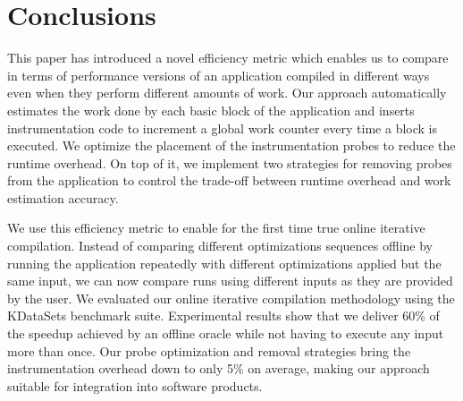 \section{Conclusions}
This paper has introduced a novel efficiency metric which enables us to compare in terms of performance versions of an application compiled
in different ways even when they perform different amounts of work. Our approach automatically estimates the work done by each basic block
of the application and inserts instrumentation code to increment a global work counter every time a block is executed. We optimize the
placement of the instrumentation probes to reduce the runtime overhead. On top of it, we implement two strategies for removing probes from
the application to control the trade-off between runtime overhead and work estimation accuracy.

We use this efficiency metric to enable for the first time true online iterative compilation. Instead of comparing different optimizations
sequences offline by running the application repeatedly with different optimizations applied but the same input, we can now compare runs
using different inputs as they are provided by the user. We evaluated our online iterative compilation methodology using the KDataSets
benchmark suite. Experimental results show that we deliver 60\% of the speedup achieved by an offline oracle while not having to
execute any input more than once. Our probe optimization and removal strategies bring the instrumentation overhead down to only 5\%
on average, making our approach suitable for integration into software products.






